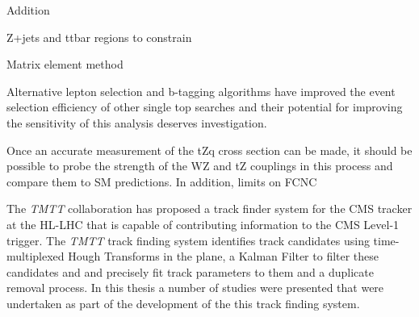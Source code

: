 Addition

Z+jets and ttbar regions to constrain 

Matrix element method ~\cite{Abazov:2004cs,Sirunyan:2017nbr}

Alternative lepton selection and b-tagging algorithms have improved the event selection efficiency of other single top searches and their potential for improving the sensitivity of this analysis deserves investigation.

Once an accurate measurement of the tZq cross section can be made, it should be possible to probe  the strength of the WZ and tZ couplings in this process and compare them to SM predictions.
In addition, limits on FCNC



%
%


The \emph{TMTT} collaboration has proposed a track finder system for the CMS tracker at the HL-LHC that is capable of contributing information to the CMS Level-1 trigger.
The \emph{TMTT} track finding system identifies track candidates using time-multiplexed Hough Transforms in the \rphi plane, a Kalman Filter to filter these candidates and and precisely fit track parameters to them and a duplicate removal process.
In this thesis a number of studies were presented that were undertaken as part of the development of the this track finding system.

